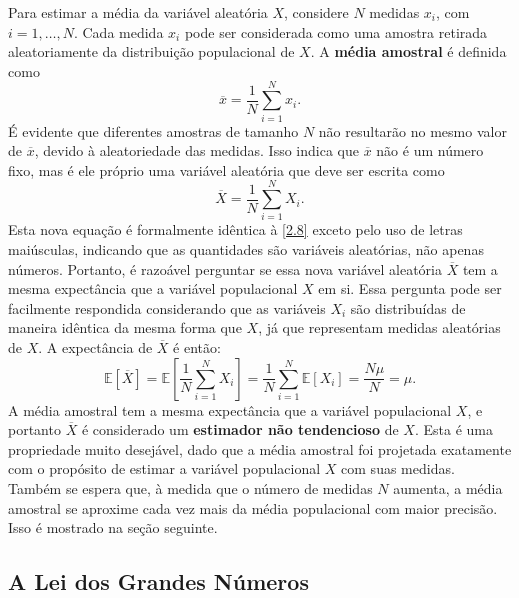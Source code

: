 Para estimar a média da variável aleatória $X$, considere $N$ medidas $x_i$, com $i = 1, \ldots, N$. Cada medida $x_i$ pode ser considerada como uma amostra retirada aleatoriamente da distribuição populacional de $X$. A \textbf{média amostral} é definida como
\begin{equation}\label{2.8}
\overline{x} = \dfrac{1}{N} \sum_{i=1}^{N} x_i.
\end{equation}
É evidente que diferentes amostras de tamanho $N$ não resultarão no mesmo valor de $\overline{x}$, devido à aleatoriedade das medidas. Isso indica que $\overline{x}$ não é um número fixo, mas é ele próprio uma variável aleatória que deve ser escrita como
\begin{equation*}
	\overline{X} = \dfrac{1}{N} \sum_{i=1}^{N} X_i.
\end{equation*}
Esta nova equação é formalmente idêntica à \eqref{2.8} exceto pelo uso de letras maiúsculas, indicando que as quantidades são variáveis aleatórias, não apenas números. Portanto, é razoável perguntar se essa nova variável aleatória $\overline{X}$ tem a mesma expectância que a variável populacional $X$ em si. Essa pergunta pode ser facilmente respondida considerando que as variáveis $X_i$ são distribuídas de maneira idêntica da mesma forma que $X$, já que representam medidas aleatórias de $X$. A expectância de $\overline{X}$ é então:
\begin{equation*}
\mathbb{E}[\overline{X}] = \mathbb{E}\left[\dfrac{1}{N} \sum_{i=1}^{N} X_i\right] = \dfrac{1}{N}\sum_{i=1}^{N}\mathbb{E}[X_i] = \dfrac{N\mu}{N} = \mu.
\end{equation*}
A média amostral tem a mesma expectância que a variável populacional $X$, e portanto $\overline{X}$ é considerado um \textbf{estimador não tendencioso} de $X$. Esta é uma propriedade muito desejável, dado que a média amostral foi projetada exatamente com o propósito de estimar a variável populacional $X$ com suas medidas. Também se espera que, à medida que o número de medidas $N$ aumenta, a média amostral se aproxime cada vez mais da média populacional com maior precisão. Isso é mostrado na seção seguinte.

\subsection{A Lei dos Grandes Números}\label{sec:2.3.2}

